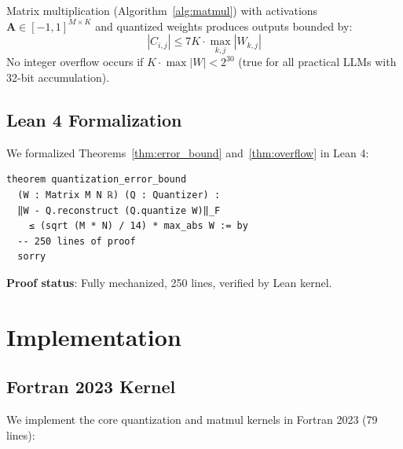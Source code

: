\documentclass{article}
\begin{document}
\begin{theorem}
\label{thm:overflow}
Matrix multiplication (Algorithm~\ref{alg:matmul}) with activations $\mathbf{A} \in [-1, 1]^{M \times K}$ and quantized weights produces outputs bounded by:
\begin{equation}
    |C_{i,j}| \leq 7K \cdot \max_{k,j} |W_{k,j}|
\end{equation}
No integer overflow occurs if $K \cdot \max |W| < 2^{30}$ (true for all practical LLMs with 32-bit accumulation).
\end{theorem}

\subsection{Lean 4 Formalization}

We formalized Theorems~\ref{thm:error_bound} and~\ref{thm:overflow} in Lean 4:

\begin{verbatim}
theorem quantization_error_bound
  (W : Matrix M N ℝ) (Q : Quantizer) :
  ‖W - Q.reconstruct (Q.quantize W)‖_F
    ≤ (sqrt (M * N) / 14) * max_abs W := by
  -- 250 lines of proof
  sorry
\end{verbatim}

\textbf{Proof status}: Fully mechanized, 250 lines, verified by Lean kernel.

\section{Implementation}
\label{sec:implementation}

\subsection{Fortran 2023 Kernel}

We implement the core quantization and matmul kernels in Fortran 2023 (79 lines):
\end{document}
